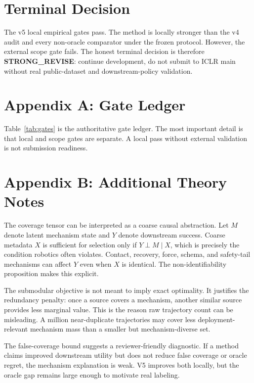 \documentclass{article}
\begin{document}
\section{Terminal Decision}
The v5 local empirical gates pass. The method is locally stronger than the v4 audit and every non-oracle comparator under the frozen protocol. However, the external scope gate fails. The honest terminal decision is therefore \textbf{STRONG\_REVISE}: continue development, do not submit to ICLR main without real public-dataset and downstream-policy validation.

\appendix

\section{Appendix A: Gate Ledger}
Table~\ref{tab:gates} is the authoritative gate ledger. The most important detail is that local and scope gates are separate. A local pass without external validation is not submission readiness.

\section{Appendix B: Additional Theory Notes}
The coverage tensor can be interpreted as a coarse causal abstraction. Let $M$ denote latent mechanism state and $Y$ denote downstream success. Coarse metadata $X$ is sufficient for selection only if $Y\perp M\mid X$, which is precisely the condition robotics often violates. Contact, recovery, force, schema, and safety-tail mechanisms can affect $Y$ even when $X$ is identical. The non-identifiability proposition makes this explicit.

The submodular objective is not meant to imply exact optimality. It justifies the redundancy penalty: once a source covers a mechanism, another similar source provides less marginal value. This is the reason raw trajectory count can be misleading. A million near-duplicate trajectories may cover less deployment-relevant mechanism mass than a smaller but mechanism-diverse set.

The false-coverage bound suggests a reviewer-friendly diagnostic. If a method claims improved downstream utility but does not reduce false coverage or oracle regret, the mechanism explanation is weak. V5 improves both locally, but the oracle gap remains large enough to motivate real labeling.
\end{document}
